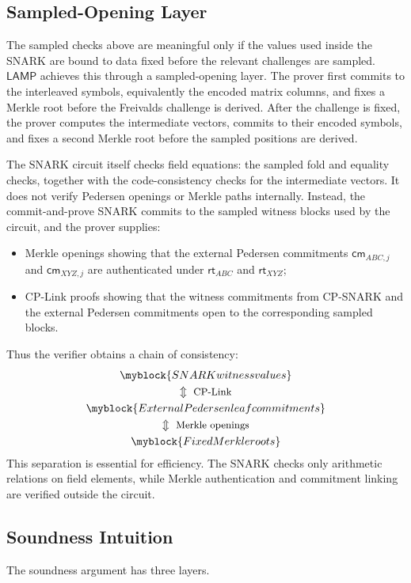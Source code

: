 \documentclass[conference,compsoc]{IEEEtran}
\newcommand{\cm}{\textsf{cm}}
\newcommand{\rt}{\textsf{rt}}
\newcommand{\protocol}{\textsf{LAMP}}   %
\theoremstyle{plain}
\theoremstyle{definition}
\theoremstyle{remark}
\begin{document}
\subsection{Sampled-Opening Layer}
\label{sec:overview-commit-link}

The sampled checks above are meaningful only if the values used inside the
SNARK are bound to data fixed before the relevant challenges are sampled.
\(\protocol\) achieves this through a sampled-opening layer.
The prover first commits to the interleaved symbols, equivalently the encoded
matrix columns, and fixes a Merkle root before the Freivalds challenge is
derived.  After the challenge is fixed, the prover computes the intermediate
vectors, commits to their encoded symbols, and fixes a second Merkle root before
the sampled positions are derived.

The SNARK circuit itself checks field equations: the sampled fold and equality
checks, together with the code-consistency checks for the intermediate vectors.
It does not verify Pedersen openings or Merkle paths internally.  Instead, the
commit-and-prove SNARK commits to the sampled witness blocks used by the
circuit, and the prover supplies:
\begin{itemize}
  \item Merkle openings showing that the external Pedersen commitments
  \(\cm_{ABC,j}\) and \(\cm_{XYZ,j}\) are authenticated under
  \(\rt_{ABC}\) and \(\rt_{XYZ}\);
  \item CP-Link proofs showing that the witness commitments from CP-SNARK and the
  external Pedersen commitments open to the corresponding sampled blocks.
\end{itemize}
Thus the verifier obtains a chain of consistency:
\begin{gather*}
\myblock{SNARK witness values} \\
\Updownarrow \ \text{\small CP-Link} \\
\myblock{External Pedersen leaf commitments} \\
\Updownarrow \ \text{\small Merkle openings} \\
\myblock{Fixed Merkle roots}
\end{gather*}
This separation is essential for efficiency.  The SNARK checks only arithmetic
relations on field elements, while Merkle authentication and commitment
linking are verified outside the circuit.

\subsection{Soundness Intuition}
\label{sec:overview-soundness}
The soundness argument has three layers. \\
\end{document}
